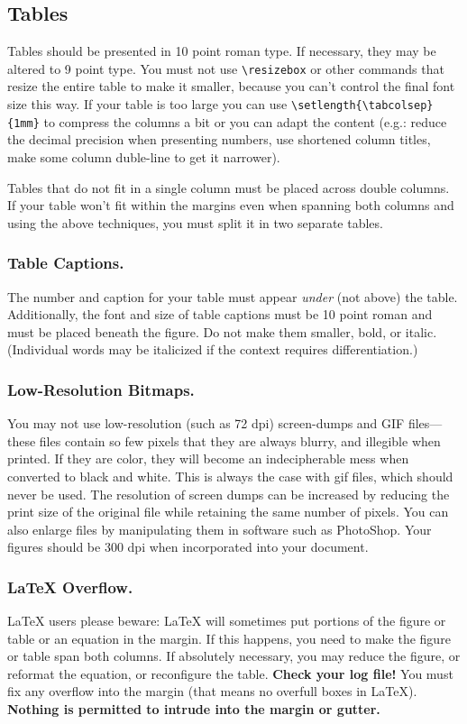 \subsection{Tables}

Tables should be presented in 10 point roman type. If necessary, they may be altered to 9 point type. You must not use \texttt{\textbackslash resizebox} or other commands that resize the entire table to make it smaller, because you can't control the final font size this way.
If your table is too large you can use \texttt{\textbackslash setlength\{\textbackslash tabcolsep\}\{1mm\}} to compress the columns a bit or you can adapt the content (e.g.: reduce the decimal precision when presenting numbers, use shortened column titles, make some column duble-line to get it narrower).

Tables that do not fit in a single column must be placed across double columns. If your table won't fit within the margins even when spanning both columns and using the above techniques, you must split it in two separate tables.

\subsubsection {Table Captions.} The number and caption for your table must appear \textit{under} (not above) the table.  Additionally, the font and size of table captions must be 10 point roman and must be placed beneath the figure. Do not make them smaller, bold, or italic. (Individual words may be italicized if the context requires differentiation.)



\subsubsection{Low-Resolution Bitmaps.}
You may not use low-resolution (such as 72 dpi) screen-dumps and GIF files---these files contain so few pixels that they are always blurry, and illegible when printed. If they are color, they will become an indecipherable mess when converted to black and white. This is always the case with gif files, which should never be used. The resolution of screen dumps can be increased by reducing the print size of the original file while retaining the same number of pixels. You can also enlarge files by manipulating them in software such as PhotoShop. Your figures should be 300 dpi when incorporated into your document.

\subsubsection{\LaTeX{} Overflow.}
\LaTeX{} users please beware: \LaTeX{} will sometimes put portions of the figure or table or an equation in the margin. If this happens, you need to make the figure or table span both columns. If absolutely necessary, you may reduce the figure, or reformat the equation, or reconfigure the table.{ \bf Check your log file!} You must fix any overflow into the margin (that means no overfull boxes in \LaTeX{}). \textbf{Nothing is permitted to intrude into the margin or gutter.}


